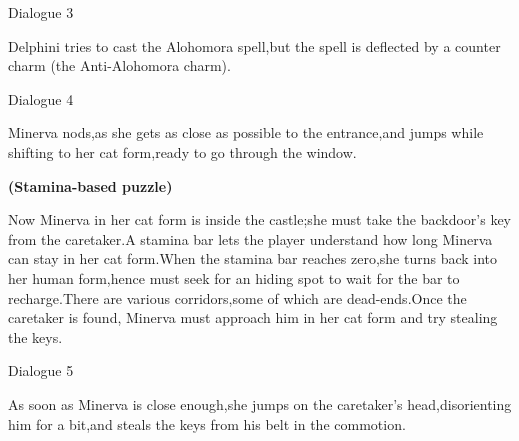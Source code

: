 \begin{dialogue}{Dialogue 3} 
\end{dialogue}

Delphini tries to cast the Alohomora spell,but the spell is deflected by a counter charm (the Anti-Alohomora charm).


\begin{dialogue}{Dialogue 4} 
\end{dialogue}

Minerva nods,as she gets as close as possible to the entrance,and jumps while shifting to her cat form,ready to go through the window.

\pagebreak

\textbf{(Stamina-based puzzle)}

Now Minerva in her cat form is inside the castle;she must take the backdoor's key from the caretaker.A stamina bar lets the player understand how long Minerva can stay in her cat form.When the stamina bar reaches zero,she turns back into her human form,hence must seek for an hiding spot to wait for the bar to recharge.There are various corridors,some of which are dead-ends.Once the caretaker is found, Minerva must approach him in her cat form and try stealing the keys.


\pagebreak

\begin{dialogue}{Dialogue 5} 
\end{dialogue} 

As soon as Minerva is close enough,she jumps on the caretaker's head,disorienting him for a bit,and steals the keys from his belt in the commotion.

